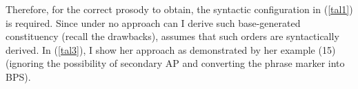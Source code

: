 \documentclass[output=paper]{langsci/langscibook}
\begin{document}
\begin{exe}

	\ex
	\hfill
	 \hfill \citep[ex. 8]{Talic:2015}

\label{tal2}
\end{exe}

Therefore, for the correct prosody to obtain, the syntactic configuration in
(\ref{tal1}) is required. Since under no approach can I derive such
base-generated constituency (recall the drawbacks), \citet{Talic:2015} assumes
that such orders are syntactically derived. In (\ref{tal3}), I show her
approach as demonstrated by her example (15) (ignoring the possibility of
secondary AP and converting the phrase marker into
\gls{BPS}).

\begin{exe}
	\ex\label{tal3}
\end{exe}
\end{document}
